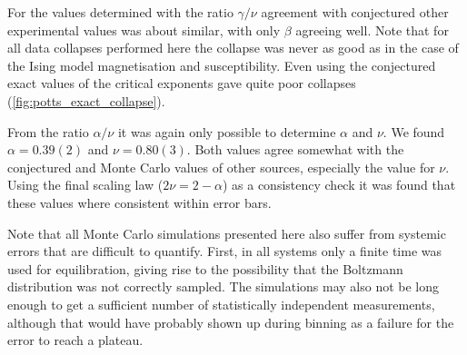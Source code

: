 \documentclass[11pt, a4paper]{report} %
\begin{document}
For the values determined with the ratio \(\gamma / \nu\) agreement with conjectured other experimental values was about similar, with only \(\beta\) agreeing well.
Note that for all data collapses performed here the collapse was never as good as in the case of the Ising model magnetisation and susceptibility.
Even using the conjectured exact values of the critical exponents gave quite poor collapses (\cref{fig:potts_exact_collapse}).

From the ratio \(\alpha/\nu\) it was again only possible to determine \(\alpha\) and \(\nu\).
We found \(\alpha = 0.39(2)\) and \(\nu = 0.80(3)\).
Both values agree somewhat with the conjectured and Monte Carlo values of other sources, especially the value for \(\nu\).
Using the final scaling law (\(2\nu = 2 -\alpha\)) as a consistency check it was found that these values where consistent within error bars.

\vspace*{\baselineskip}

Note that all Monte Carlo simulations presented here also suffer from systemic errors that are difficult to quantify.
First, in all systems only a finite time was used for equilibration, giving rise to the possibility that the Boltzmann distribution was not correctly sampled.
The simulations may also not be long enough to get a sufficient number of statistically independent measurements\cite{newman:1999}, although that would have probably shown up during binning as a failure for the error to reach a plateau.
\end{document}
